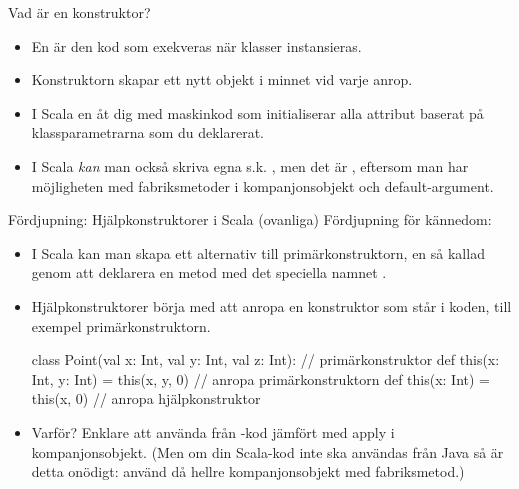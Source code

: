 \begin{Slide}{Vad är en konstruktor?}
\begin{itemize}
\item En  är den kod som exekveras när klasser instansieras.

\item Konstruktorn skapar ett nytt objekt i minnet vid varje anrop.

\item I Scala  en  åt dig med maskinkod som initialiserar alla attribut baserat på klassparametrarna som du deklarerat.

\pause


\item I Scala \emph{kan} man också skriva egna s.k.  , men det är , eftersom man har möjligheten med fabriksmetoder i kompanjonsobjekt och default-argument.
\end{itemize}
\end{Slide}


\begin{Slide}{Fördjupning: Hjälpkonstruktorer i Scala (ovanliga)}\SlideFontTiny
Fördjupning för kännedom:
\begin{itemize}
\item I Scala kan man skapa ett alternativ till primärkonstruktorn, en så kallad   genom att deklarera en metod med det speciella namnet .


\item Hjälpkonstruktorer  börja med att anropa en  konstruktor som står  i koden, till exempel primärkonstruktorn.

\begin{Code}
class Point(val x: Int, val y: Int, val z: Int): // primärkonstruktor
  def this(x: Int, y: Int) = this(x, y, 0) // anropa primärkonstruktorn
  def this(x: Int) = this(x, 0) // anropa hjälpkonstruktor
\end{Code}
\item Varför? Enklare att använda från -kod jämfört med apply i kompanjonsobjekt. (Men om din Scala-kod inte ska användas från Java så är detta onödigt: använd då hellre kompanjonsobjekt med fabriksmetod.)

\end{itemize}

\end{Slide}


